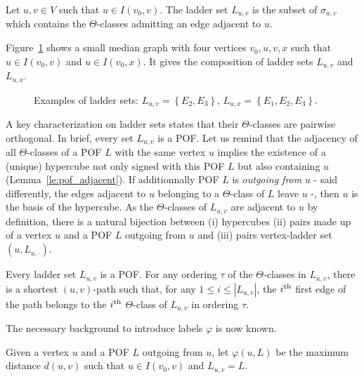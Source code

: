 \documentclass[a4paper,UKenglish,numberwithinsect,cleveref, autoref]{lipics-v2021}
\newcommand{\set}[1]{\left\{ #1 \right\}}
\newcommand{\card}[1]{\left| #1 \right|}
\newcommand{\ith}[1]{#1^{\mbox{\scriptsize{th}}}}
\begin{document}
\begin{definition}
Let $u,v \in V$ such that $u \in I(v_0,v)$. The ladder set $L_{u,v}$ is the subset of $\sigma_{u,v}$ which contains the $\Theta$-classes admitting an edge adjacent to $u$.
\label{def:ladder}
\end{definition}

Figure~\ref{fig:compute_labels} shows a small median graph with four vertices $v_0,u,v,x$ such that $u \in I(v_0,v)$ and $u \in I(v_0,x)$. It gives the composition of ladder sets $L_{u,v}$ and $L_{u,x}$.

\begin{figure}[h]
\centering
\scalebox{0.8}{}
\caption{Examples of ladder sets: $L_{u,v} = \set{E_2,E_3}$, $L_{u,x} = \set{E_1,E_2,E_3}$.}
\label{fig:compute_labels}
\end{figure}

A key characterization on ladder sets states that their $\Theta$-classes are pairwise orthogonal. In brief, every set $L_{u,v}$ is a POF. Let us remind that the adjacency of all $\Theta$-classes of a POF $L$ with the same vertex $u$ implies the existence of a (unique) hypercube not only signed with this POF $L$ but also containing $u$ (Lemma~\ref{le:pof_adjacent}). If additionnally POF $L$ is \textit{outgoing from} $u$ - said differently, the edges adjacent to $u$ belonging to a $\Theta$-class of $L$ leave $u$ -, then $u$ is the basis of the hypercube.  As the $\Theta$-classes of $L_{u,v}$ are adjacent to $u$ by definition, there is a natural bijection between (i) hypercubes (ii) pairs made up of a vertex $u$ and a POF $L$ outgoing from $u$ and (iii) pairs vertex-ladder set $(u,L_{u,\cdot})$.

\begin{lemma}
Every ladder set $L_{u,v}$ is a POF. For any ordering $\tau$ of the $\Theta$-classes in $L_{u,v}$, there is a shortest $(u,v)$-path such that, for any $1\le i \le \card{L_{u,v}}$, the $\ith{i}$ first edge of the path belongs to the $\ith{i}$ $\Theta$-class of $L_{u,v}$ in ordering $\tau$.
\label{le:ladder_POF}
\end{lemma}

The necessary background to introduce labels $\varphi$ is now known.

\begin{definition}
Given a vertex $u$ and a POF $L$ outgoing from $u$, let $\varphi(u,L)$ be the maximum distance $d(u,v)$ such that $u \in I(v_0,v)$ and $L_{u,v} = L$.
\label{def:varphi}
\end{definition}
\end{document}
